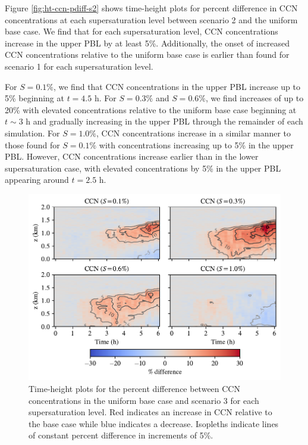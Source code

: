 Figure \ref{fig:ht-ccn-pdiff-s2} shows time-height plots for percent difference in CCN concentrations at each supersaturation level between scenario 2 and the uniform base case. We find that for each supersaturation level, CCN concentrations increase in the upper PBL by at least 5\%. Additionally, the onset of increased CCN concentrations relative to the uniform base case is earlier than found for scenario 1 for each supersaturation level. 

For $S=0.1\%$, we find that CCN concentrations in the upper PBL increase up to 5\% beginning at $t=4.5$ h. For $S=0.3\%$ and $S=0.6\%$, we find increases of up to 20\% with elevated concentrations relative to the uniform base case beginning at $t\sim3$ h and gradually increasing in the upper PBL through the remainder of each simulation. For $S=1.0\%$, CCN concentrations increase in a similar manner to those found for $S=0.1\%$ with concentrations increasing up to 5\% in the upper PBL. However, CCN concentrations increase earlier than in the lower supersaturation case, with elevated concentrations by 5\% in the upper PBL appearing around $t=2.5$ h.

\begin{figure}[!t]
  \centering
    \includegraphics[width=\textwidth]{figures/chapter5/height-time-ccn-pdiff-point-source-1x1.pdf}
    \caption{Time-height plots for the percent difference between CCN concentrations in the uniform base case and scenario 3 for each supersaturation level. Red indicates an increase in CCN relative to the base case while blue indicates a decrease. Isopleths indicate lines of constant percent difference in increments of 5\%.}
    \label{fig:ht-ccn-pdiff-s3}
\end{figure}

